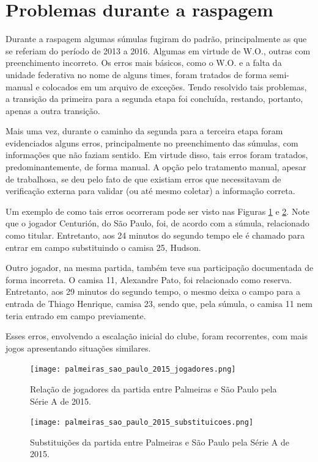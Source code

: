 \section{Problemas durante a raspagem}

Durante a raspagem algumas súmulas fugiram do padrão, principalmente as que se referiam do período de 2013 a 2016. Algumas em virtude de W.O., outras com preenchimento incorreto. Os erros mais básicos, como o W.O. e a falta da unidade federativa no nome de alguns times, foram tratados de forma semi-manual e colocados em um arquivo  de exceções. Tendo resolvido tais problemas, a transição da primeira para a segunda etapa foi concluída, restando, portanto, apenas a outra transição.

Mais uma vez, durante o caminho da segunda para a terceira etapa foram evidenciados alguns erros, principalmente no preenchimento das súmulas, com informações que não faziam sentido. Em virtude disso, tais erros foram tratados, predominantemente, de forma manual. A opção pelo tratamento manual, apesar de trabalhosa, se deu pelo fato de que existiam erros que necessitavam de verificação externa para validar (ou até mesmo coletar) a informação correta.

Um exemplo de como tais erros ocorreram pode ser visto nas Figuras \ref{erro_ext1} e \ref{erro_ext2}. Note que o jogador Centurión, do São Paulo, foi, de acordo com a súmula, relacionado como titular. Entretanto, aos 24 minutos do segundo tempo ele é chamado para entrar em campo substituindo o camisa 25, Hudson.

Outro jogador, na mesma partida, também teve sua participação documentada de forma incorreta. O camisa 11, Alexandre Pato, foi relacionado como reserva. Entretanto, aos 29 minutos do segundo tempo, o mesmo deixa o campo para a entrada de Thiago Henrique, camisa 23, sendo que, pela súmula, o camisa 11 nem teria entrado em campo previamente.

Esses erros, envolvendo a escalação inicial do clube, foram recorrentes, com mais jogos apresentando situações similares.
\begin{figure}[H]
    \centering
    \texttt{[image: palmeiras\_sao\_paulo\_2015\_jogadores.png]}
    \caption{Relação de jogadores da partida entre Palmeiras e São Paulo pela Série A de 2015.}
    \label{erro_ext1}
\end{figure}

\begin{figure}[H]
    \centering
    \texttt{[image: palmeiras\_sao\_paulo\_2015\_substituicoes.png]}
    \caption{Substituições da partida entre Palmeiras e São Paulo pela Série A de 2015.}
    \label{erro_ext2}
\end{figure}

